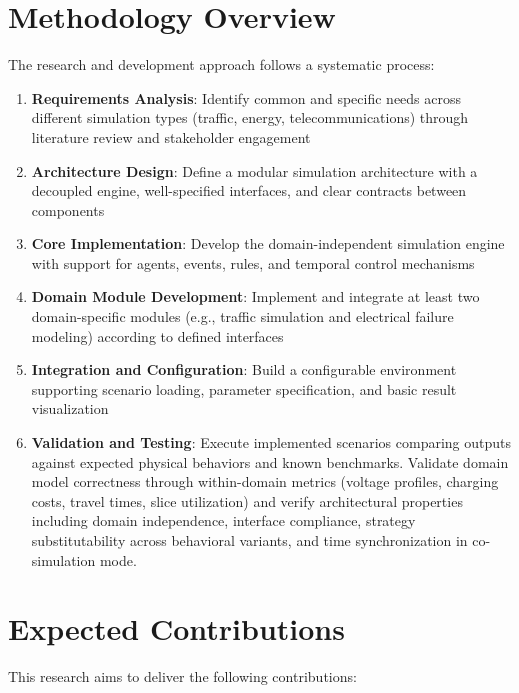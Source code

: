 \section{Methodology Overview}

The research and development approach follows a systematic process:

\begin{enumerate}
    \item \textbf{Requirements Analysis}: Identify common and specific needs across different simulation types (traffic, energy, telecommunications) through literature review and stakeholder engagement
    
    \item \textbf{Architecture Design}: Define a modular simulation architecture with a decoupled engine, well-specified interfaces, and clear contracts between components
    
    \item \textbf{Core Implementation}: Develop the domain-independent simulation engine with support for agents, events, rules, and temporal control mechanisms
    
    \item \textbf{Domain Module Development}: Implement and integrate at least two domain-specific modules (e.g., traffic simulation and electrical failure modeling) according to defined interfaces
    
    \item \textbf{Integration and Configuration}: Build a configurable environment supporting scenario loading, parameter specification, and basic result visualization
    
    \item \textbf{Validation and Testing}: Execute implemented scenarios comparing outputs against expected physical behaviors and known benchmarks. Validate domain model correctness through within-domain metrics (voltage profiles, charging costs, travel times, slice utilization) and verify architectural properties including domain independence, interface compliance, strategy substitutability across behavioral variants, and time synchronization in co-simulation mode.
\end{enumerate}


\section{Expected Contributions}

This research aims to deliver the following contributions:

